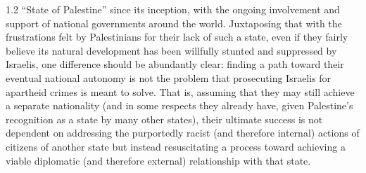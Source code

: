 \documentclass[../unravbook.tex]{subfiles}
\begin{document}
\begin{spacing}{1.2}
\enquote{State of Palestine} since its inception, with the ongoing involvement and support of national governments around the world.  Juxtaposing that with the frustrations felt by Palestinians for their lack of such a state, even if they fairly believe its natural development has been willfully stunted and suppressed by Israelis, one difference should be abundantly clear: finding a path toward their eventual national autonomy is not the problem that prosecuting Israelis for apartheid crimes is meant to solve. That is, assuming that they may still achieve a separate nationality (and in some respects they already have, given Palestine's recognition as a state by many other states), their ultimate success is not dependent on addressing the purportedly racist (and therefore internal) actions of citizens of another state but instead resuscitating a process toward achieving a viable diplomatic (and therefore external) relationship with that state. 


\end{spacing}
\end{document}
